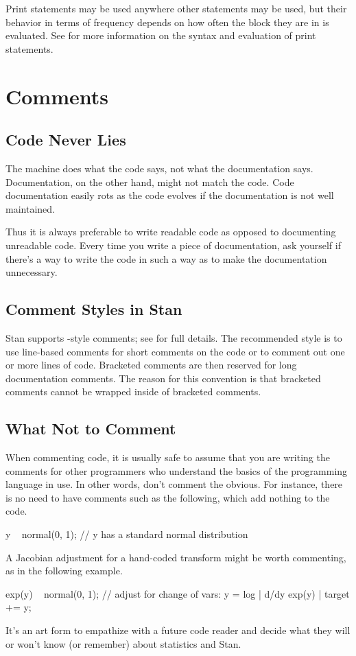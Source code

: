 Print statements may be used anywhere other statements may be used,
but their behavior in terms of frequency depends on how often the
block they are in is evaluated.  See  for
more information on the syntax and evaluation of print statements.



\section{Comments}\label{comments-programming.section}

\subsection{Code Never Lies}

The machine does what the code says, not what the documentation says.
Documentation, on the other hand, might not match the code.  Code
documentation easily rots as the code evolves if the documentation is
not well maintained.

Thus it is always preferable to write readable code as opposed to
documenting unreadable code.  Every time you write a piece of
documentation, ask yourself if there's a way to write the code in such
a way as to make the documentation unnecessary.


\subsection{Comment Styles in Stan}

Stan supports \Cpp-style comments; see  for full
details.  The recommended style is to use line-based comments for
short comments on the code or to comment out one or more
lines of code.  Bracketed comments are then reserved for long
documentation comments.  The reason for this convention is that
bracketed comments cannot be wrapped inside of bracketed comments.

\subsection{What Not to Comment}

When commenting code, it is usually safe to assume that you are
writing the comments for other programmers who understand the basics
of the programming language in use.  In other words, don't comment the
obvious.  For instance, there is no need to have comments
such as the following, which add nothing to the code.
%
\begin{stancode}
y ~ normal(0, 1);  // y has a standard normal distribution
\end{stancode}
%
A Jacobian adjustment for a hand-coded transform might be worth
commenting, as in the following example.
%
\begin{stancode}
exp(y) ~ normal(0, 1);
// adjust for change of vars: y = log | d/dy exp(y) |
target += y;
\end{stancode}
%
It's an art form to empathize with a future code reader and decide
what they will or won't know (or remember) about statistics and Stan.

